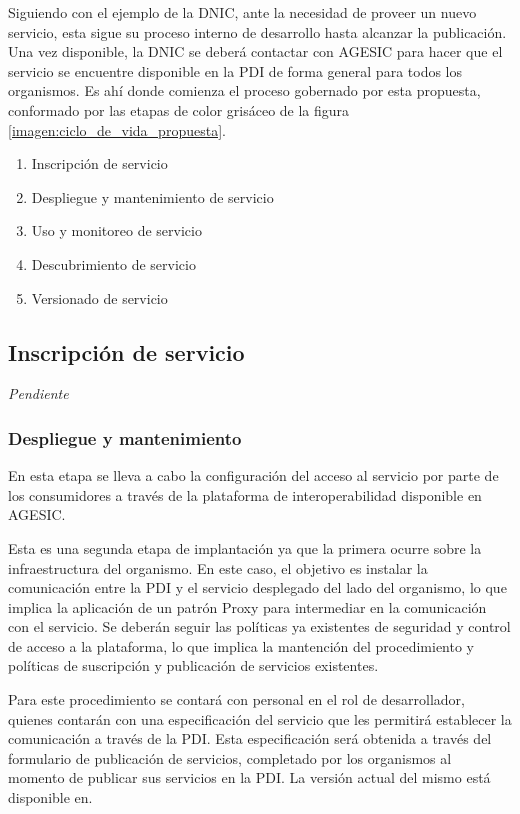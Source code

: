 \documentclass[11pt]{article}
\begin{document}
			Siguiendo con el ejemplo de la DNIC, ante la necesidad de proveer un nuevo servicio, esta sigue su proceso interno de desarrollo hasta alcanzar la publicación. Una vez disponible, la DNIC se deberá contactar con AGESIC para hacer que el servicio se encuentre disponible en la PDI de forma general para todos los organismos. Es ahí donde comienza el proceso gobernado por esta propuesta, conformado por las etapas de color grisáceo de la figura \ref{imagen:ciclo_de_vida_propuesta}.

			\begin{enumerate}
				\item Inscripción de servicio
				\item Despliegue y mantenimiento de servicio
				\item Uso y monitoreo de servicio
				\item Descubrimiento de servicio
				\item Versionado de servicio
			\end{enumerate}

			\subsection{Inscripción de servicio}
				\emph{Pendiente} %

			\subsubsection{Despliegue y mantenimiento}
				En esta etapa se lleva a cabo la configuración del acceso al servicio por parte de los consumidores a través de la plataforma de interoperabilidad disponible en AGESIC.

				Esta es una segunda etapa de implantación ya que la primera ocurre sobre la infraestructura del organismo. En este caso, el objetivo es instalar la comunicación entre la PDI y el servicio desplegado del lado del organismo, lo que implica la aplicación de un patrón Proxy para intermediar en la comunicación con el servicio. Se deberán seguir las políticas ya existentes de seguridad y control de acceso a la plataforma, lo que implica la mantención del procedimiento y políticas de suscripción y publicación de servicios existentes.

				Para este procedimiento se contará con personal en el rol de desarrollador, quienes contarán con una especificación del servicio que les permitirá establecer la comunicación a través de la PDI. Esta especificación será obtenida a través del formulario de publicación de servicios, completado por los organismos al momento de publicar sus servicios en la PDI. La versión actual del mismo está disponible en.
\end{document}
